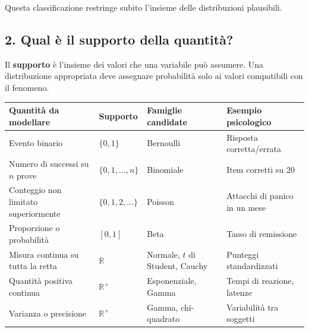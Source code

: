 \documentclass[
  italian,
  letterpaper,
  a4paper,
  11pt,
  open=any]{scrbook}
\newcounter{none} %
\theoremstyle{plain}
\theoremstyle{definition}
\theoremstyle{definition}
\theoremstyle{remark}
\begin{document}
Questa classificazione restringe subito l'insieme delle distribuzioni
plausibili.

\subsection{2. Qual è il supporto della
quantità?}\label{qual-uxe8-il-supporto-della-quantituxe0}

Il \textbf{supporto} è l'insieme dei valori che una variabile può
assumere. Una distribuzione appropriata deve assegnare probabilità solo
ai valori compatibili con il fenomeno.

{\def\LTcaptype{none} %
\begin{longtable}[]{@{}
  >{\raggedright\arraybackslash}p{}
  >{\raggedright\arraybackslash}p{}
  >{\raggedright\arraybackslash}p{}
  >{\raggedright\arraybackslash}p{}@{}}
\toprule\noalign{}
\begin{minipage}[b]{\linewidth}\raggedright
Quantità da modellare
\end{minipage} & \begin{minipage}[b]{\linewidth}\raggedright
Supporto
\end{minipage} & \begin{minipage}[b]{\linewidth}\raggedright
Famiglie candidate
\end{minipage} & \begin{minipage}[b]{\linewidth}\raggedright
Esempio psicologico
\end{minipage} \\
\midrule\noalign{}
\endhead
\bottomrule\noalign{}
\endlastfoot
Evento binario & \(\{0,1\}\) & Bernoulli & Risposta corretta/errata \\
Numero di successi su \(n\) prove & \(\{0,1,\ldots,n\}\) & Binomiale &
Item corretti su 20 \\
Conteggio non limitato superiormente & \(\{0,1,2,\ldots\}\) & Poisson &
Attacchi di panico in un mese \\
Proporzione o probabilità & \([0,1]\) & Beta & Tasso di remissione \\
Misura continua su tutta la retta & \(\mathbb{R}\) & Normale, \(t\) di
Student, Cauchy & Punteggi standardizzati \\
Quantità positiva continua & \(\mathbb{R}^+\) & Esponenziale, Gamma &
Tempi di reazione, latenze \\
Varianza o precisione & \(\mathbb{R}^+\) & Gamma, chi-quadrato &
Variabilità tra soggetti \\
\end{longtable}
}
\end{document}
